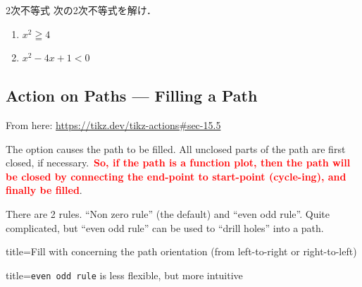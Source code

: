 \documentclass[../geometrymemo.tex]{subfiles}
\begin{document}
\vspace{\baselineskip}

\begin{reidai2}{2次不等式}{}
    次の2次不等式を解け．\vspace{-8pt}
    \begin{enumerate}[(1)\;]
        \item \(x^2 \geqq 4\)
        \item \(x^2-4x+1 < 0\)
    \end{enumerate}
\end{reidai2}

\subsection{Action on Paths --- Filling a Path}

From here: \url{https://tikz.dev/tikz-actions#sec-15.5}

The  option causes the path to be filled. All unclosed parts of the path are first closed, if necessary.\ \textcolor{red}{\textbf{So, if the path is a function plot, then the path will be closed by connecting the end-point to start-point (cycle-ing), and finally be filled}}.

There are 2 rules. ``Non zero rule'' (the default) and ``even odd rule''. Quite complicated, but ``even odd rule'' can be used to ``drill holes'' into a path.

\begin{tcblisting}{title=Fill with concerning the path orientation (from left-to-right or right-to-left)}
\end{tcblisting}

\begin{tcblisting}{title={\texttt{even odd rule} is less flexible, but more intuitive}}
\end{tcblisting}
\end{document}
